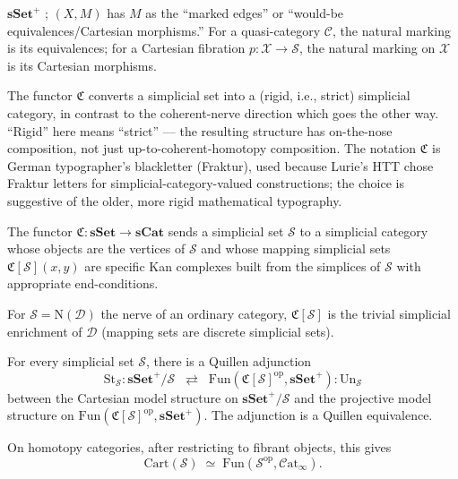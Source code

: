 \begin{howtosay}
$\mathbf{sSet}^+$ ; $(X, M)$ has $M$ as
the ``marked edges'' or ``would-be equivalences/Cartesian morphisms.'' For
a quasi-category $\mathcal{C}$, the natural marking is its equivalences;
for a Cartesian fibration $p : \mathcal{X} \to \mathcal{S}$, the natural
marking on $\mathcal{X}$ is its Cartesian morphisms.
\end{howtosay}

\begin{nameorigin}
The  functor $\mathfrak{C}$ converts a simplicial
set into a (rigid, i.e., strict) simplicial category, in contrast to
the coherent-nerve direction which goes the other way. ``Rigid'' here
means ``strict'' — the resulting structure has on-the-nose composition,
not just up-to-coherent-homotopy composition. The notation $\mathfrak{C}$
is German typographer's blackletter (Fraktur), used because Lurie's HTT
chose Fraktur letters for simplicial-category-valued constructions; the
choice is suggestive of the older, more rigid mathematical typography.
\end{nameorigin}

\begin{definition}
\label{def:rigidification}
The  functor $\mathfrak{C} : \mathbf{sSet} \to
\mathbf{sCat}$ sends a simplicial set $\mathcal{S}$ to a simplicial category
whose objects are the vertices of $\mathcal{S}$ and whose mapping
simplicial sets $\mathfrak{C}[\mathcal{S}](x, y)$ are specific Kan
complexes built from the simplices of $\mathcal{S}$ with appropriate
end-conditions.

For $\mathcal{S} = \mathrm{N}(\mathcal{D})$ the nerve of an ordinary
category, $\mathfrak{C}[\mathcal{S}]$ is the trivial simplicial enrichment
of $\mathcal{D}$ (mapping sets are discrete simplicial sets).
\end{definition}

\begin{theorem}
\label{thm:straightening}
For every simplicial set $\mathcal{S}$, there is a Quillen adjunction
\begin{equation*}
  \mathrm{St}_\mathcal{S} : \mathbf{sSet}^+ \!/ \mathcal{S} \;\;\rightleftarrows\;\;
  \mathrm{Fun}(\mathfrak{C}[\mathcal{S}]^{\mathrm{op}}, \mathbf{sSet}^+) : \mathrm{Un}_\mathcal{S}
\end{equation*}
between the Cartesian model structure on $\mathbf{sSet}^+\!/\mathcal{S}$
and the projective model structure on $\mathrm{Fun}(\mathfrak{C}[\mathcal{S}]^{\mathrm{op}},
\mathbf{sSet}^+)$. The adjunction is a Quillen equivalence.

On homotopy categories, after restricting to fibrant objects, this gives
\begin{equation*}
  \mathrm{Cart}(\mathcal{S}) \;\simeq\; \mathrm{Fun}(\mathcal{S}^{\mathrm{op}}, \mathcal{C}\mathrm{at}_\infty).
\end{equation*}
\end{theorem}

